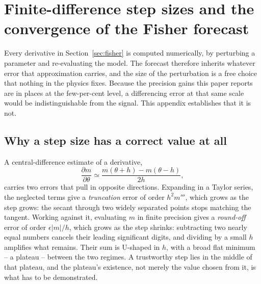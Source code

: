 %
%

\appendix

\section{Finite-difference step sizes and the convergence of the Fisher forecast}
\label{app:stepsize}

Every derivative in Section~\ref{sec:fisher} is computed numerically, by perturbing a parameter
and re-evaluating the model. The forecast therefore inherits whatever error that approximation
carries, and the size of the perturbation is a free choice that nothing in the physics fixes.
Because the precision gains this paper reports are in places at the few-per-cent level, a
differencing error at that same scale would be indistinguishable from the signal. This appendix
establishes that it is not.

\subsection{Why a step size has a correct value at all}
\label{app:stepsize_theory}

A central-difference estimate of a derivative,
\[
\frac{\partial m}{\partial\theta} \simeq \frac{m(\theta+h) - m(\theta-h)}{2h},
\]
carries two errors that pull in opposite directions. Expanding in a Taylor series, the neglected
terms give a \emph{truncation} error of order $h^2 m'''$, which grows as the step grows: the
secant through two widely separated points stops matching the tangent. Working against it,
evaluating $m$ in finite precision gives a \emph{round-off} error of order $\epsilon |m| / h$,
which grows as the step shrinks: subtracting two nearly equal numbers cancels their leading
significant digits, and dividing by a small $h$ amplifies what remains. Their sum is U-shaped in
$h$, with a broad flat minimum -- a plateau -- between the two regimes. A trustworthy step lies in
the middle of that plateau, and the plateau's existence, not merely the value chosen from it, is
what has to be demonstrated.

